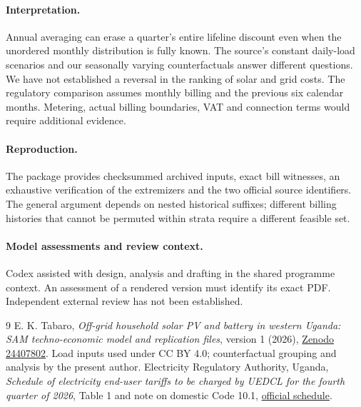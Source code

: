 \documentclass[11pt]{article}
\begin{document}
\paragraph{Interpretation.} Annual averaging can erase a quarter's entire lifeline discount even when the unordered monthly distribution is fully known. The source's constant daily-load scenarios and our seasonally varying counterfactuals answer different questions. We have not established a reversal in the ranking of solar and grid costs. The regulatory comparison assumes monthly billing and the previous six calendar months. Metering, actual billing boundaries, VAT and connection terms would require additional evidence.

\paragraph{Reproduction.} The package provides checksummed archived inputs, exact bill witnesses, an exhaustive verification of the extremizers and the two official source identifiers. The general argument depends on nested historical suffixes; different billing histories that cannot be permuted within strata require a different feasible set.

\paragraph{Model assessments and review context.} Codex assisted with design, analysis and drafting in the shared programme context. An assessment of a rendered version must identify its exact PDF. Independent external review has not been established.

\begin{thebibliography}{9}
 E. K. Tabaro, \emph{Off-grid household solar PV and battery in western Uganda: SAM techno-economic model and replication files}, version 1 (2026), \href{https://doi.org/10.5281/zenodo.24407802}{Zenodo 24407802}. Load inputs used under CC BY 4.0; counterfactual grouping and analysis by the present author.
 Electricity Regulatory Authority, Uganda, \emph{Schedule of electricity end-user tariffs to be charged by UEDCL for the fourth quarter of 2026}, Table 1 and note on domestic Code 10.1, \href{https://www.era.go.ug/wp-content/uploads/2026/10/SCHEDULE-OF-ELECTRICITY-PRICES-FOR-Q4-2026.pdf}{official schedule}.
\end{thebibliography}
\end{document}

